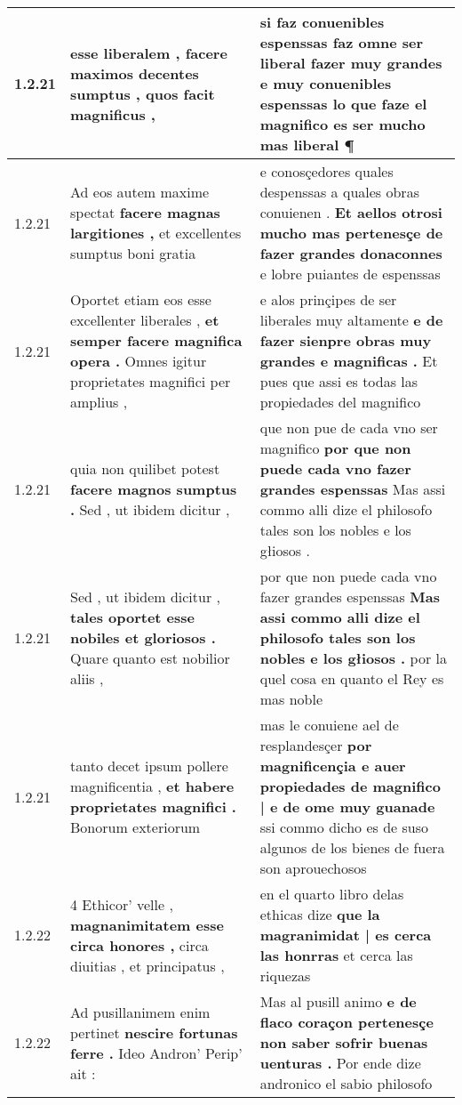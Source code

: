 \begin{tabular}{|p{1cm}|p{6.5cm}|p{6.5cm}|}
1.2.21 & esse liberalem , \textbf{ facere maximos decentes sumptus , } quos facit magnificus , & si faz conuenibles espenssas faz omne ser liberal fazer muy grandes \textbf{ e muy conuenibles espenssas } lo que faze el magnifico es ser mucho mas liberal ¶ \\\hline
1.2.21 & Ad eos autem maxime spectat \textbf{ facere magnas largitiones , } et excellentes sumptus boni gratia & e conosçedores quales despenssas a quales obras conuienen . \textbf{ Et aellos otrosi mucho mas pertenesçe de fazer grandes donaconnes } e lobre puiantes de espenssas \\\hline
1.2.21 & Oportet etiam eos esse excellenter liberales , \textbf{ et semper facere magnifica opera . } Omnes igitur proprietates magnifici per amplius , & e alos prinçipes de ser liberales muy altamente \textbf{ e de fazer sienpre obras muy grandes e magnificas . } Et pues que assi es todas las propiedades del magnifico \\\hline
1.2.21 & quia non quilibet potest \textbf{ facere magnos sumptus . } Sed , ut ibidem dicitur , & que non pue de cada vno ser magnifico \textbf{ por que non puede cada vno fazer grandes espenssas } Mas assi commo alli dize el philosofo tales son los nobles e los głiosos . \\\hline
1.2.21 & Sed , ut ibidem dicitur , \textbf{ tales oportet esse nobiles et gloriosos . } Quare quanto est nobilior aliis , & por que non puede cada vno fazer grandes espenssas \textbf{ Mas assi commo alli dize el philosofo tales son los nobles e los głiosos . } por la quel cosa en quanto el Rey es mas noble \\\hline
1.2.21 & tanto decet ipsum pollere magnificentia , \textbf{ et habere proprietates magnifici . } Bonorum exteriorum & mas le conuiene ael de resplandesçer \textbf{ por magnificençia e auer propiedades de magnifico | e de ome muy guanade } ssi commo dicho es de suso algunos de los bienes de fuera son aprouechosos \\\hline
1.2.22 & 4 Ethicor’ velle , \textbf{ magnanimitatem esse circa honores , } circa diuitias , et principatus , & en el quarto libro delas ethicas dize \textbf{ que la magranimidat | es cerca las honrras } et cerca las riquezas \\\hline
1.2.22 & Ad pusillanimem enim pertinet \textbf{ nescire fortunas ferre . } Ideo Andron’ Perip’ ait : & Mas al pusill animo \textbf{ e de flaco coraçon pertenesçe non saber sofrir buenas uenturas . } Por ende dize andronico el sabio philosofo \\\hline

\end{tabular}
